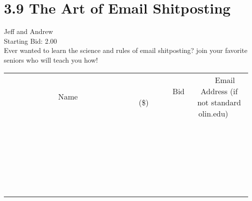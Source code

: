 \documentclass[11pt]{article}
\begin{document}
					\section*{3.9 The Art of Email Shitposting}
					Jeff and Andrew \\
					Starting Bid: 2.00 \\
					Ever wanted to learn the science and rules of email shitposting? join your favorite seniors who will teach you how! \\
					[6ex]
					\begin{tabular}{c c c}
						~~~~~~~~~~~~~Name~~~~~~~~~~~~~ & ~~~~~~~~~Bid (\$)~~~~~~~~~ & ~~~Email Address (if not standard olin.edu)~~~ \\
				
 & & \\
\hline
 & & \\
\hline
 & & \\
\hline
 & & \\
\hline
 & & \\
\hline
 & & \\
\hline
 & & \\
\hline
 & & \\
\hline
 & & \\
\hline
 & & \\
\hline
 & & \\
\hline
 & & \\
\hline
 & & \\
\hline
 & & \\
\hline
 & & \\
\hline
 & & \\
\hline
 & & \\
\hline
 & & \\
\hline
 & & \\
\hline
 & & \\
\hline
 & & \\
\hline
 & & \\
\hline
 & & \\
\hline
 & & \\
\hline
 & & \\
\hline
 & & \\
\hline
					\end{tabular}
					\clearpage
				
\end{document}
